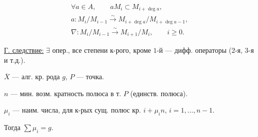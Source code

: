 \[
\begin{gathered}
\forall a\in A,\qquad aM_i\subset M_{i+\operatorname{deg}a},\\
a:M_i/M_{i-1}\overset{\sim}{\to}M_{i+\operatorname{deg}a}/M_{i+\operatorname{deg}a-1},\\
\nabla:M_i/M_{i-1}\overset{\sim}{\to}M_{i+1}/M_i,\qquad i\geqslant0.
\end{gathered}
\]

\underline{Г. следствие:} \(\exists\) опер., все степени к-рого, кроме \(1\)-й ---
дифф. операторы (\(2\)-я, \(3\)-я и т.д.).

\(\overline X\) --- алг. кр. рода \(g\), \(P\) --- точка.

\(n\) --- мин. возм. кратность полюса в т. \(P\) (единств. полюса).

\(\mu_i\) --- наим. числа, для к-рых сущ. полюс кр. \(i+\mu_i n\), \(i=1,\ldots,n-1\).

Тогда \(\sum\mu_i=g\).



